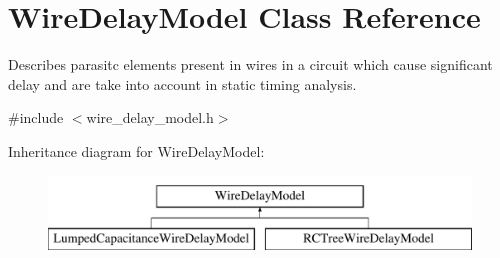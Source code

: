 \hypertarget{classWireDelayModel}{\section{Wire\-Delay\-Model Class Reference}
\label{classWireDelayModel}
}


Describes parasitc elements present in wires in a circuit which cause significant delay and are take into account in static timing analysis.  




{\ttfamily \#include $<$wire\-\_\-delay\-\_\-model.\-h$>$}

Inheritance diagram for Wire\-Delay\-Model\-:\begin{figure}[H]
\begin{center}
\leavevmode
\includegraphics[height=2.000000cm]{classWireDelayModel}
\end{center}
\end{figure}
